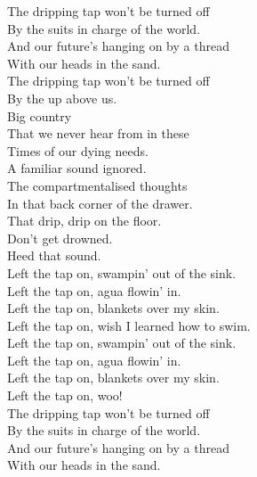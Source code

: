 
\label{album:omnium-gatherum}





The dripping tap won't be turned off \\
By the suits in charge of the world. \\
And our future's hanging on by a thread \\
With our heads in the sand. \\

The dripping tap won't be turned off \\
By the  up above us. \\
Big  country \\
That we never hear from in these \\
Times of our dying needs. \\

A familiar sound ignored. \\
The compartmentalised thoughts \\
In that back corner of the drawer. \\
That drip, drip on the floor. \\
Don't get drowned. \\
Heed that sound. \\

Left the tap on, swampin' out of the sink. \\
Left the tap on, agua flowin' in. \\
Left the tap on, blankets over my skin. \\
Left the tap on, wish I learned how to swim. \\

Left the tap on, swampin' out of the sink. \\
Left the tap on, agua flowin' in. \\
Left the tap on, blankets over my skin. \\
Left the tap on, woo! \\

The dripping tap won't be turned off \\
By the suits in charge of the world. \\
And our future's hanging on by a thread \\
With our heads in the sand. \\

